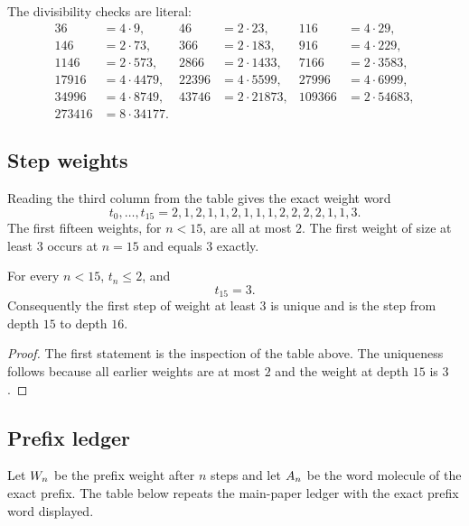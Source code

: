 The divisibility checks are literal:
\begin{align*}
  36&=4\cdot9, & 46&=2\cdot23, & 116&=4\cdot29, \\
  146&=2\cdot73, & 366&=2\cdot183, & 916&=4\cdot229, \\
  1146&=2\cdot573, & 2866&=2\cdot1433, & 7166&=2\cdot3583, \\
  17916&=4\cdot4479, & 22396&=4\cdot5599, & 27996&=4\cdot6999, \\
  34996&=4\cdot8749, & 43746&=2\cdot21873, & 109366&=2\cdot54683, \\
  273416&=8\cdot34177.
\end{align*}

\subsection{Step weights}

Reading the third column from the table gives the exact weight word
\begin{equation*}
  t_0,\dots,t_{15}
  =2,1,2,1,1,2,1,1,1,2,2,2,2,1,1,3.
\end{equation*}
The first fifteen weights, for $n<15$, are all at most $2$.  The first
weight of size at least $3$ occurs at $n=15$ and equals $3$ exactly.

\begin{lemma}\label{sup-lem:first-big}
For every $n<15$, $t_n\le2$, and
\begin{equation*}
  t_{15}=3.
\end{equation*}
Consequently the first step of weight at least $3$ is unique and is
the step from depth $15$ to depth $16$.
\end{lemma}

\begin{proof}
The first statement is the inspection of the table above.  The
uniqueness follows because all earlier weights are at most $2$ and the
weight at depth $15$ is $3$.
\end{proof}

\subsection{Prefix ledger}

Let $W_n$ be the prefix weight after $n$ steps and let
$A_n$ be the word molecule of the exact prefix.  The table below
repeats the main-paper ledger with the exact prefix word displayed.


